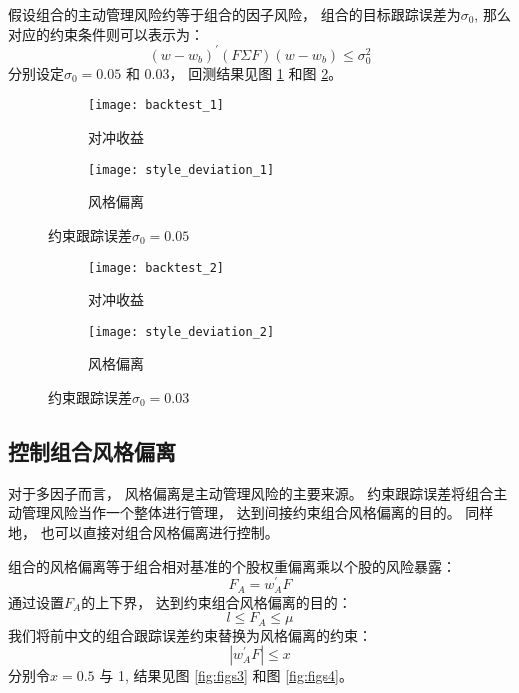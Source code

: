 \documentclass[UTF8,11pt]{ctexart}
\begin{document}
假设组合的主动管理风险约等于组合的因子风险， 组合的目标跟踪误差为$\sigma_0$, 那么对应的约束条件则可以表示为：
\begin{equation}
(w-w_b)^\prime(F\Sigma F)(w-w_b)\le \sigma_0^2
\end{equation}
分别设定$\sigma_0=0.05$ 和 0.03， 回测结果见图 \ref{fig:figs1} 和图 \ref{fig:figs2}。
\begin{figure}
	\centering
	\begin{subfigure}[b]{0.45\textwidth}
		\centering
		\texttt{[image: backtest\_1]}
		\caption{对冲收益}
	\end{subfigure}
	\hfill
	\begin{subfigure}[b]{0.45\textwidth}
		\centering
		\texttt{[image: style\_deviation\_1]}
		\caption{风格偏离}
	\end{subfigure}
	\caption{约束跟踪误差$\sigma_0=0.05$}
	\label{fig:figs1}
\end{figure}

\begin{figure}
	\centering
	\begin{subfigure}[b]{0.45\textwidth}
		\centering
		\texttt{[image: backtest\_2]}
		\caption{对冲收益}
	\end{subfigure}
	\hfill
	\begin{subfigure}[b]{0.45\textwidth}
		\centering
		\texttt{[image: style\_deviation\_2]}
		\caption{风格偏离}
	\end{subfigure}
	\caption{约束跟踪误差$\sigma_0=0.03$}
	\label{fig:figs2}
\end{figure}

\subsection{控制组合风格偏离}
对于多因子而言， 风格偏离是主动管理风险的主要来源。 约束跟踪误差将组合主动管理风险当作一个整体进行管理， 达到间接约束组合风格偏离的目的。 同样地， 也可以直接对组合风格偏离进行控制。

组合的风格偏离等于组合相对基准的个股权重偏离乘以个股的风险暴露：
\begin{equation}
F_A=w_A^\prime F
\end{equation}
通过设置$F_A$的上下界， 达到约束组合风格偏离的目的：
\begin{equation}
l\le F_A \le \mu
\end{equation}
我们将前中文的组合跟踪误差约束替换为风格偏离的约束：
\begin{equation}
|w_A^\prime F|\le x
\end{equation}
分别令$x=0.5$ 与 1, 结果见图 \ref{fig:figs3} 和图 \ref{fig:figs4}。
\end{document}

